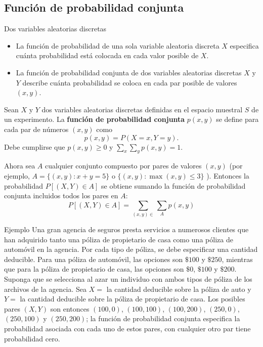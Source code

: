 \documentclass[11pt]{beamer}
\begin{document}
\subsection{Función de probabilidad conjunta}


\begin{frame}{Dos variables aleatorias discretas}
\begin{itemize}
\item
La función de probabilidad de una sola variable aleatoria discreta $X$ especifica cuánta probabilidad está colocada en cada valor posible de $X$.  
\item La función de probabilidad conjunta de dos variables aleatorias discretas $X$ y $Y$ describe cuánta probabilidad se coloca en cada par posible de valores $(x,y)$.
\end{itemize}
\end{frame}


\begin{frame}{}
Sean $X$ y $Y$ dos variables aleatorias discretas  definidas en el espacio muestral $S$ de un experimento. La {\bf función de probabilidad conjunta} $p(x,y)$ se define para cada par de números $(x,y)$ como 
$$p(x,y)=P(X=x,Y=y).$$
Debe cumplirse que $p(x,y) \ge 0$ y $\sum_{x} \sum_{y} p(x,y)=1$.

\bigskip
Ahora sea $A$ cualquier conjunto compuesto por pares de valores $(x,y)$ (por ejemplo, $A= \{(x,y): x+y=5\}$ o $\{(x,y): \max (x,y) \le 3\}$ ). Entonces la probabilidad $P[ (X,Y) \in A]$ se obtiene sumando la función de probabilidad  conjunta incluidos todos los pares en $A$: 
$$P[ (X,Y) \in A] = \sum_{(x,y) \in} \sum_{A} p(x,y)$$
\end{frame}


\begin{frame}{Ejemplo}
Una gran agencia de seguros presta servicios a numerosos clientes que han adquirido tanto
una póliza de propietario de casa como una póliza de automóvil en la agencia. Por cada tipo
de póliza, se debe especificar una cantidad deducible. Para una póliza de automóvil, las
opciones son $\$100$ y $\$250$, mientras que para la póliza de propietario de casa, las opciones
son $\$0$, $\$100$ y $\$200$. Suponga que se selecciona al azar un individuo con ambos tipos de póliza
de los archivos de la agencia. Sea $X=$ la cantidad deducible sobre la póliza de auto y $Y=$ la cantidad deducible sobre la póliza de propietario de casa. Los posibles pares $(X, Y)$ son
entonces $(100, 0)$, $(100, 100)$, $(100, 200)$, $(250, 0)$, $(250, 100)$ y $(250, 200)$; la función 
de probabilidad conjunta especifica la probabilidad asociada con cada uno de estos pares,
con cualquier otro par tiene probabilidad cero.
\end{frame}
\end{document}
